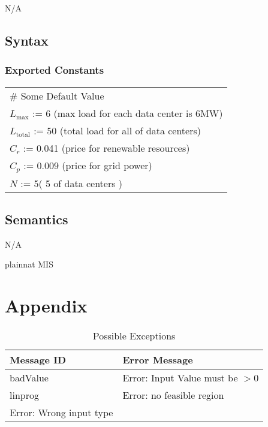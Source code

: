 \documentclass[12pt, titlepage]{article}
\begin{document}
N/A

\subsection{Syntax}

\subsubsection{Exported Constants}

\renewcommand{\arraystretch}{1.2}
\begin{longtable*}[l]{l} 
\# Some Default Value\\
  $L_\text{max}$ := 6 (max load for each data center is 6MW)\\
  $L_\text{total}$ := 50 (total load for all of data centers)\\
  $C_r$ := 0.041 (price for renewable resources)\\
  $C_p$ := 0.009 (price for grid power)\\
  $N$ := 5( 5 of data centers )\\
  
\end{longtable*}



\subsection{Semantics}

N/A

\newpage

 {plainnat}
 {MIS}

\newpage

\section{Appendix} \label{Appendix}

\renewcommand{\arraystretch}{1.2}

\begin{longtable}{l p{12cm}}
\caption{Possible Exceptions} \\
\toprule
\textbf{Message ID} & \textbf{Error Message} \\
\midrule
badValue & Error: Input Value must be $> 0$ \\
linprog & Error: no feasible region \\
Error: Wrong input type \\

\bottomrule
\end{longtable}
\end{document}
